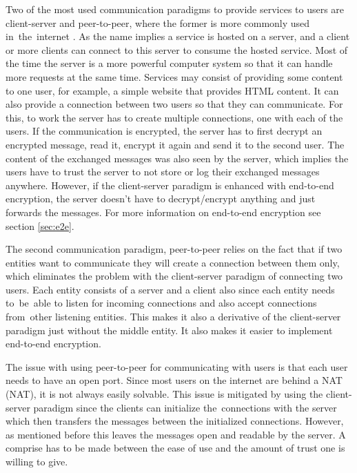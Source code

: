 Two of the most used communication paradigms to provide services to users are client-server and peer-to-peer, where the former is more commonly used in~the~internet \cite{Forouzan2010}. As the name implies a service is hosted on a server, and a client or more clients can connect to this server to consume the hosted service. Most of the time the server is a more powerful computer system so that it can handle more requests at the same time. Services may consist of providing some content to one user, for example, a simple website that provides HTML content. It can also provide a connection between two users so that they can communicate. For this, to work the server has to create multiple connections, one with each of the users. If the communication is encrypted, the server has to first decrypt an encrypted message, read it, encrypt it again and send it to the second user. The content of the exchanged messages was also seen by the server, which implies the users have to trust the server to not store or log their exchanged messages anywhere. However, if the client-server paradigm is enhanced with end-to-end encryption, the server doesn't have to decrypt/encrypt anything and just forwards the messages. For more information on end-to-end encryption see section \ref{sec:e2e}.

The second communication paradigm, peer-to-peer relies on the fact that if two entities want to communicate they will create a connection between them only, which eliminates the problem with the client-server paradigm of connecting two users. Each entity consists of a server and a client also since each entity needs to~be~able to listen for incoming connections and also accept connections from~other listening entities. This makes it also a derivative of the client-server paradigm just without the middle entity. It also makes it easier to implement end-to-end encryption.

The issue with using peer-to-peer for communicating with users is that each user needs to have an open port. Since most users on the internet are behind a NAT (\acl{NAT}), it is not always easily solvable. This issue is mitigated by using the client-server paradigm since the clients can initialize the~connections with the server which then transfers the messages between the initialized connections. However, as mentioned before this leaves the messages open and readable by the server. A comprise has to be made between the ease of use and the amount of trust one is willing to give.
